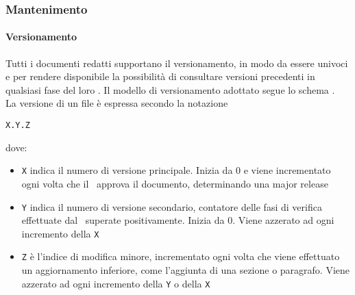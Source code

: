 		\subsubsection{Mantenimento}\label{Mantenimento}

			\paragraph{Versionamento} \label{Versionamento}
			Tutti i documenti redatti supportano il versionamento, in modo da essere univoci e per rendere disponibile la possibilità di consultare versioni
			precedenti in qualsiasi fase del loro .
			Il modello di versionamento adottato segue lo schema .\\La versione di un file è espressa secondo la notazione
			\begin{center}
				\texttt{X.Y.Z}
			\end{center}
			\indent dove:
			\begin{itemize}
				\item \texttt{X} indica il numero di versione principale. Inizia da 0 e viene incrementato ogni volta che il \Res\ approva il documento,
					determinando una major release
				\item \texttt{Y} indica il numero di versione secondario, contatore delle fasi di verifica effettuate dal \Ver\ superate positivamente.
					Inizia da 0. Viene azzerato ad ogni incremento della \texttt{X}
				\item \texttt{Z} è l'indice di modifica minore, incrementato ogni volta che viene effettuato un aggiornamento inferiore, come l'aggiunta
					di una sezione o paragrafo. Viene azzerato ad ogni incremento della \texttt{Y} o della \texttt{X}
			\end{itemize}


			
